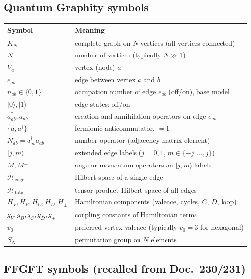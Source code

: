 \subsection*{Quantum Graphity symbols}

\begin{center}
\renewcommand{\arraystretch}{1.3}
{\small
\begin{tabular}{>{\raggedright\arraybackslash}p{3.6cm}>{\raggedright\arraybackslash}p{7.4cm}}
\toprule
\textbf{Symbol} & \textbf{Meaning} \\
\midrule
$K_N$ & complete graph on $N$ vertices (all vertices connected) \\
$N$ & number of vertices (typically $N \gg 1$) \\
$V_a$ & vertex (node) $a$ \\
$e_{ab}$ & edge between vertex $a$ and $b$ \\
$n_{ab} \in \{0, 1\}$ & occupation number of edge $e_{ab}$ (off/on), base model \\
$|0\rangle, |1\rangle$ & edge states: off/on \\
$a^\dagger_{ab}, a_{ab}$ & creation and annihilation operators on edge $e_{ab}$ \\
$\{a, a^\dagger\}$ & fermionic anticommutator, $= 1$ \\
$N_{ab} = a^\dagger_{ab} a_{ab}$ & number operator (adjacency matrix element) \\
$|j, m\rangle$ & extended edge labels ($j = 0, 1$, $m \in \{-j, \ldots, j\}$) \\
$M, M^\pm$ & angular momentum operators on $|j, m\rangle$ labels \\
$\mathcal{H}_{\text{edge}}$ & Hilbert space of a single edge \\
$\mathcal{H}_{\text{total}}$ & tensor product Hilbert space of all edges \\
$H_V, H_B, H_C, H_D, H_\pm$ & Hamiltonian components (valence, cycles, $C$, $D$, loop) \\
$g_V, g_B, g_C, g_D, g_\pm$ & coupling constants of Hamiltonian terms \\
$v_0$ & preferred vertex valence (typically $v_0 = 3$ for hexagonal) \\
$S_N$ & permutation group on $N$ elements \\
\bottomrule
\end{tabular}
}
\renewcommand{\arraystretch}{1.0}
\end{center}

\subsection*{FFGFT symbols (recalled from Doc.~230/231)}

